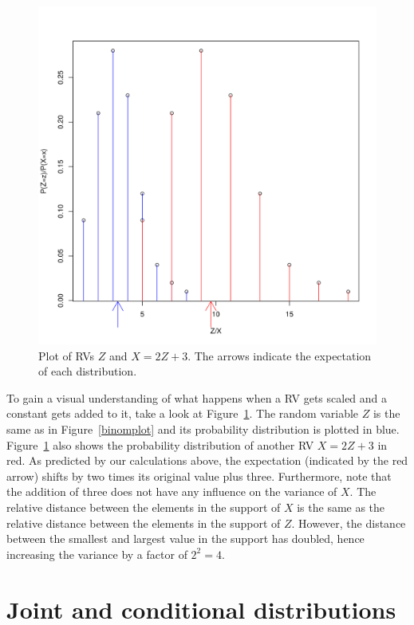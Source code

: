 \begin{figure}
\center
\includegraphics[scale=.4]{scaledRV.png}
\caption{Plot of RVs $ Z $ and $ X = 2Z+3 $. The arrows indicate the expectation of each distribution.}
\label{scaledRV}
\end{figure}

To gain a visual understanding of what happens when a RV gets scaled and a constant gets added to it, take a look at Figure~\ref{scaledRV}. The random variable 
$ Z $ is the same as in Figure~\ref{binomplot} and its probability distribution is plotted in blue. Figure~\ref{scaledRV} also shows the probability distribution
of another RV $ X = 2Z + 3 $ in red. As predicted by our calculations above, the expectation (indicated by the red arrow) shifts by two times its original value plus
three. Furthermore, note that the addition of three does not have any influence on the variance of $ X $. The relative distance between the elements in the support
of $ X $ is the same as the relative distance between the elements in the support of $ Z $. However, the distance between the smallest and largest value in the support
has doubled, hence increasing the variance by a factor of $ 2^{2} = 4 $.


\section{Joint and conditional distributions} \label{sec:jointconditionaldistributions}

